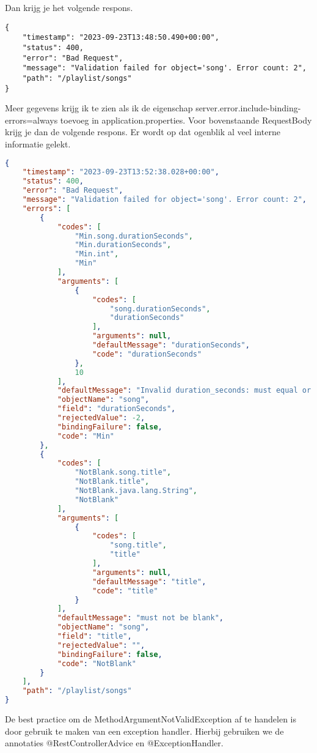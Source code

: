Dan krijg je het volgende respons.

\begin{verbatim}
{
	"timestamp": "2023-09-23T13:48:50.490+00:00",
	"status": 400,
	"error": "Bad Request",
	"message": "Validation failed for object='song'. Error count: 2",
	"path": "/playlist/songs"
}
\end{verbatim}

Meer gegevens krijg ik te zien als ik de eigenschap server.error.include-binding-errors=always toevoeg in application.properties. Voor bovenstaande RequestBody krijg je dan de volgende respons. Er wordt op dat ogenblik al veel interne informatie gelekt.

\begin{lstlisting}[language=json]
{
	"timestamp": "2023-09-23T13:52:38.028+00:00",
	"status": 400,
	"error": "Bad Request",
	"message": "Validation failed for object='song'. Error count: 2",
	"errors": [
		{
			"codes": [
				"Min.song.durationSeconds",
				"Min.durationSeconds",
				"Min.int",
				"Min"
			],
			"arguments": [
				{
					"codes": [
						"song.durationSeconds",
						"durationSeconds"
					],
					"arguments": null,
					"defaultMessage": "durationSeconds",
					"code": "durationSeconds"
				},
				10
			],
			"defaultMessage": "Invalid duration_seconds: must equal or exceed 10.",
			"objectName": "song",
			"field": "durationSeconds",
			"rejectedValue": -2,
			"bindingFailure": false,
			"code": "Min"
		},
		{
			"codes": [
				"NotBlank.song.title",
				"NotBlank.title",
				"NotBlank.java.lang.String",
				"NotBlank"
			],
			"arguments": [
				{
					"codes": [
						"song.title",
						"title"
					],
					"arguments": null,
					"defaultMessage": "title",
					"code": "title"
				}
			],
			"defaultMessage": "must not be blank",
			"objectName": "song",
			"field": "title",
			"rejectedValue": "",
			"bindingFailure": false,
			"code": "NotBlank"
		}
	],
	"path": "/playlist/songs"
}
\end{lstlisting}

De best practice om de MethodArgumentNotValidException af te handelen is door gebruik te maken van een exception handler.  Hierbij gebruiken we de annotaties @RestControllerAdvice en @ExceptionHandler. 

